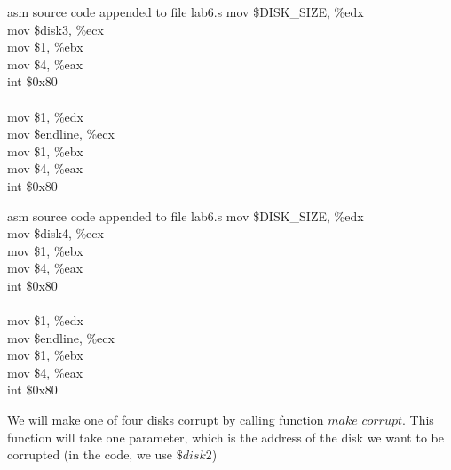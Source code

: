 \documentclass{article}
\begin{document}
\begin{multicols}{2}
\begin{GFT}{asm source code appended to file lab6.s}
\+mov \$DISK\_SIZE, \%edx\\
\+mov \$disk3, \%ecx\\
\+mov \$1, \%ebx\\
\+mov \$4, \%eax\\
\+int \$0x80\\
\+\\
\+mov \$1, \%edx\\
\+mov \$endline, \%ecx\\
\+mov \$1, \%ebx\\
\+mov \$4, \%eax\\
\+int \$0x80\\
\end{GFT}
\columnbreak
\begin{GFT}{asm source code appended to file lab6.s}
\+mov \$DISK\_SIZE, \%edx\\
\+mov \$disk4, \%ecx\\
\+mov \$1, \%ebx\\
\+mov \$4, \%eax\\
\+int \$0x80\\
\+\\
\+mov \$1, \%edx\\
\+mov \$endline, \%ecx\\
\+mov \$1, \%ebx\\
\+mov \$4, \%eax\\
\+int \$0x80\\
\end{GFT}
\end{multicols}
We will make one of four disks corrupt by calling function $make\_corrupt$. This function will take one parameter, which is the address of the disk we want to be corrupted (in the code, we use $\$disk2$)
\end{document}
